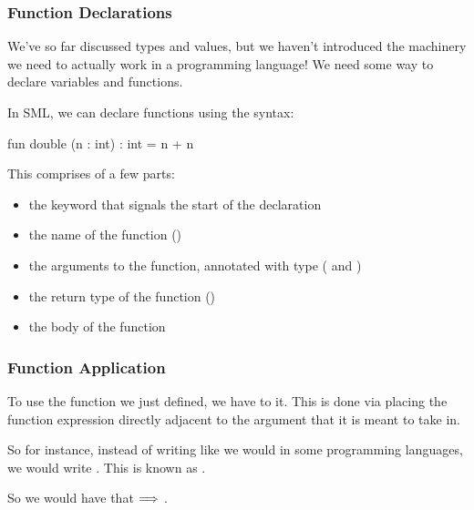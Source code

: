 \documentclass[aspectratio=169, handout]{beamer}
\begin{document}
\begin{frame}[fragile]
  \frametitle{Function Declarations}

  We've so far discussed types and values, but we haven't introduced the machinery
  we need to actually work in a programming language! We need some way to declare
  variables and functions.

  \pause
  \vspace{\fill}

  In SML, we can declare functions using the  syntax:

  \vspace{5pt}

  \begin{codeblock}
    fun double (n : int) : int = n + n
  \end{codeblock}

  \pause
  \vspace{\fill}

  This comprises of a few parts:
  \begin{itemize}
    \item the  keyword that signals the start of the declaration
    \item the name of the function ()
    \item the arguments to the function, annotated with type ( and )
    \item the return type of the function ()
    \item the body of the function 
  \end{itemize}
\end{frame}

\begin{frame}[fragile]
  \frametitle{Function Application}

  To use the function we just defined, we have to  it. This is done via
  placing the function expression directly adjacent to the argument that it is meant
  to take in.

  \pause
  \vspace{\fill}

  So for instance, instead of writing  like we would in some programming
  languages, we would write . This is known as .

  \pause
  \vspace{\fill}

  So we would have that  $\Longrightarrow$ .
\end{frame}
\end{document}
